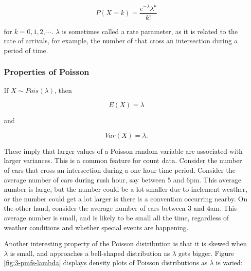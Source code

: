 \documentclass[
]{book}
\begin{document}
\begin{equation} 
P(X=k) = \frac{e^{-\lambda}\lambda^k}{k!} 
\label{eq:3-pois}
\end{equation}

for \(k=0,1,2,\cdots\). \(\lambda\) is sometimes called a rate parameter, as it is related to the rate of arrivals, for example, the number of that cross an intersection during a period of time.

\hypertarget{properties-of-poisson}{%
\subsubsection{Properties of Poisson}\label{properties-of-poisson}}

If \(X \sim Pois(\lambda)\), then

\begin{equation} 
E(X) = \lambda
\label{eq:3-pois-EX}
\end{equation}

and

\begin{equation} 
Var(X) = \lambda.
\label{eq:3-pois-var}
\end{equation}

These imply that larger values of a Poisson random variable are associated with larger variances. This is a common feature for count data. Consider the number of cars that cross an intersection during a one-hour time period. Consider the average number of cars during rush hour, say between 5 and 6pm. This average number is large, but the number could be a lot smaller due to inclement weather, or the number could get a lot larger is there is a convention occurring nearby. On the other hand, consider the average number of cars between 3 and 4am. This average number is small, and is likely to be small all the time, regardless of weather conditions and whether special events are happening.

Another interesting property of the Poisson distribution is that it is skewed when \(\lambda\) is small, and approaches a bell-shaped distribution as \(\lambda\) gets bigger. Figure \ref{fig:3-pmfs-lambda} displays density plots of Poisson distributions as \(\lambda\) is varied:
\end{document}
